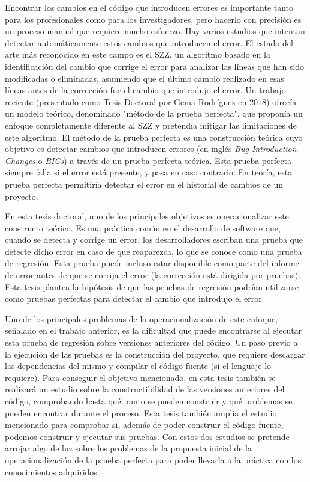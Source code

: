 Encontrar los cambios en el código que introducen errores es importante tanto para los profesionales como para los investigadores, pero hacerlo con precisión es un proceso manual que requiere mucho esfuerzo.
Hay varios estudios que intentan detectar automáticamente estos cambios que introducen el error. 
El estado del arte más reconocido en este campo es el SZZ, un algoritmo basado en la identificación del cambio que corrige el error para analizar las líneas que han sido modificadas o eliminadas, asumiendo que el último cambio realizado en esas líneas antes de la corrección fue el cambio que introdujo el error. 
Un trabajo reciente (presentado como Tesis Doctoral por Gema Rodríguez en 2018) ofrecía un modelo teórico, denominado "método de la prueba perfecta", que proponía un enfoque completamente diferente al SZZ y pretendía mitigar las limitaciones de este algoritmo. 
El método de la prueba perfecta es una construcción teórica cuyo objetivo es detectar cambios que introducen errores (en inglés \textit{Bug Introduction Changes} o \textit{BICs}) a través de un prueba perfecta teórica. 
Esta prueba perfecta siempre falla si el error está presente, y pasa en caso contrario.
En teoría, esta prueba perfecta permitiría detectar el error en el historial de cambios de un proyecto.

En esta tesis doctoral, uno de los principales objetivos es operacionalizar este constructo teórico.
Es una práctica común en el desarrollo de software que, cuando se detecta y corrige un error, los desarrolladores escriban una prueba que detecte dicho error en caso de que reaparezca, lo que se conoce como una prueba de regresión. 
Esta prueba puede incluso estar disponible como parte del informe de error antes de que se corrija el error (la corrección está dirigida por pruebas). 
Esta tesis plantea la hipótesis de que las pruebas de regresión podrían utilizarse como pruebas perfectas para detectar el cambio que introdujo el error.

Uno de los principales problemas de la operacionalización de este enfoque, señalado en el trabajo anterior, es la dificultad que puede encontrarse al ejecutar esta prueba de regresión sobre versiones anteriores del código. 
Un paso previo a la ejecución de las pruebas es la construcción del proyecto, que requiere descargar las dependencias del mismo y compilar el código fuente (si el lenguaje lo requiere). 
Para conseguir el objetivo mencionado, en esta tesis también se realizará un estudio sobre la constructibilidad de las versiones anteriores del código, comprobando hasta qué punto se pueden construir y qué problemas se pueden encontrar durante el proceso.
Esta tesis también amplía el estudio mencionado para comprobar si, además de poder construir el código fuente, podemos construir y ejecutar sus pruebas. 
Con estos dos estudios se pretende arrojar algo de luz sobre los problemas de la propuesta inicial de la operacionalización de la prueba perfecta para poder llevarla a la práctica con los conocimientos adquiridos.


